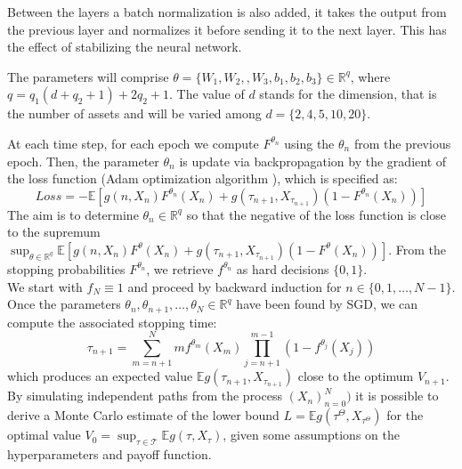 \documentclass{article}
\begin{document}
Between the layers a batch normalization is also added, it takes the output from the previous layer and normalizes it before sending it to the next layer. This has the effect of stabilizing the neural network. 

The parameters will comprise $\theta = \{W_1, W_2,, W_3, b_1, b_2, b_3\}\in \mathbb{R}^q$, where $q=q_1(d+q_2+1)+2q_2+1$. The value of $d$ stands for the dimension, that is the number of assets and will be varied among $d=\{2,4, 5, 10, 20\}$. 


At each time step, for each epoch we compute $F^{\theta_n}$ using the $\theta_n$ from the previous epoch. Then, the parameter $\theta_n$ is update via backpropagation by the gradient of the loss function (Adam optimization algorithm \citep{kingma2014adam}), which is specified as:
\begin{equation}
    Loss = - \mathbb{E}[g(n, X_n)F^{\theta_n}(X_n) + g(\tau_{n+1}, X_{\tau_{n+1}})(1-F^{\theta_n}(X_n))]
\end{equation}
The aim is to determine $\theta_n \in \mathbb{R}^q$ so that the negative of the loss function is close to the supremum $\sup_{\theta \in \mathbb{R}^q}\mathbb{E}[g(n, X_n)F^{\theta}(X_n) + g(\tau_{n+1}, X_{\tau_{n+1}})(1-F^{\theta}(X_n))   ]$. From the stopping probabilities $F^{\theta_n}$, we retrieve $f^{\theta_n}$ as hard decisions $\{0,1  \}$. \\

We start with $f_N \equiv 1$ and proceed by backward induction for $n \in \{0, 1, \ldots, N-1 \}$. Once the parameters $\theta_n, \theta_{n+1}, \ldots, \theta_N \in \mathbb{R}^q$ have been found by SGD, we can compute the associated stopping time: 
\begin{equation}
\tau_{n+1} = \sum_{m=n+1}^N m f^{\theta_m}(X_m) \prod _{j=n+1}^{m-1} (1-f^{\theta_j}(X_j))
\end{equation}
which produces an expected value $\mathbb{E}g(\tau_{n+1}, X_{\tau_{n+1}})$ close to the optimum $V_{n+1}$. By simulating independent paths from the process $(X_n)_{n=0}^N)$ it is possible to derive a Monte Carlo estimate of the lower bound $L=\mathbb{E}g(\tau^{\Theta}, X_{\tau^{\Theta}})$ for the optimal value $V_0=\sup_{\tau \in \mathcal{T}}\mathbb{E}g(\tau, X_{\tau})$, given some assumptions on the hyperparameters and payoff function. 
\end{document}

